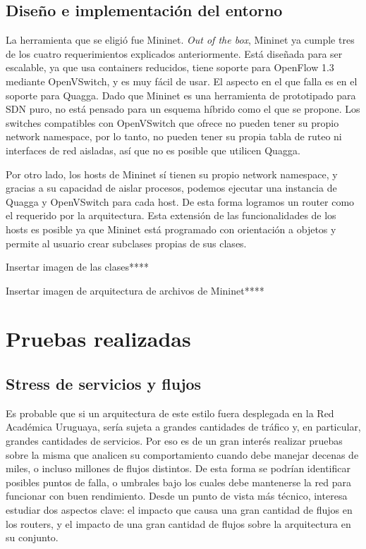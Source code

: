 \documentclass[a4paper,12pt]{report}
\begin{document}
\subsection{Diseño e implementación del entorno}
La herramienta que se eligió fue Mininet. \textit{Out of the box}, Mininet ya cumple tres de los cuatro requerimientos explicados anteriormente. Está diseñada para ser escalable, ya que usa containers reducidos, tiene soporte para OpenFlow 1.3 mediante OpenVSwitch, y es muy fácil de usar. El aspecto en el que falla es en el soporte para Quagga. Dado que Mininet es una herramienta de prototipado para SDN puro, no está pensado para un esquema híbrido como el que se propone. Los switches compatibles con OpenVSwitch que ofrece no pueden tener su propio network namespace, por lo tanto, no pueden tener su propia tabla de ruteo ni interfaces de red aisladas, así que no es posible que utilicen Quagga.

Por otro lado, los hosts de Mininet sí tienen su propio network namespace, y gracias a su capacidad de aislar procesos, podemos ejecutar una instancia de Quagga y OpenVSwitch para cada host. De esta forma logramos un router como el requerido por la arquitectura. Esta extensión de las funcionalidades de los hosts es posible ya que Mininet está programado con orientación a objetos y permite al usuario crear subclases propias de sus clases.

Insertar imagen de las clases****

Insertar imagen de arquitectura de archivos de Mininet****



\section{Pruebas realizadas}

\subsection{Stress de servicios y flujos}
Es probable que si un arquitectura de este estilo fuera desplegada en la Red Académica Uruguaya, sería sujeta a grandes cantidades de tráfico y, en particular, grandes cantidades de servicios. Por eso es de un gran interés realizar pruebas sobre la misma que analicen su comportamiento cuando debe manejar decenas de miles, o incluso millones de flujos distintos. De esta forma se podrían identificar posibles puntos de falla, o umbrales bajo los cuales debe mantenerse la red para funcionar con buen rendimiento.
Desde un punto de vista más técnico, interesa estudiar dos aspectos clave: el impacto que causa una gran cantidad de flujos en los routers, y el impacto de una gran cantidad de flujos sobre la arquitectura en su conjunto.
\end{document}
